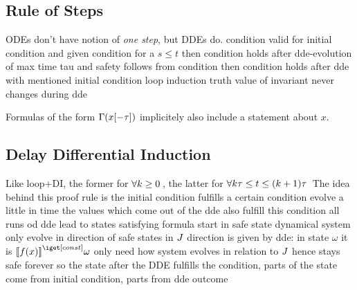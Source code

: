 \documentclass[10pt]{report}
\begin{document}
    \subsection{Rule of Steps}
        \label{sec:rule-of-steps}
        ODEs don't have notion of \emph{one step}, but DDEs do.
        condition valid for initial condition and given condition for a $s\leq t$ then condition holds after dde-evolution of max time tau and safety follows from condition then condition holds after dde with mentioned initial condition
        loop induction
        truth value of invariant never changes during dde

        \begin{calculus}
        \end{calculus}

        Formulas of the form $\Gamma(x[-\tau])$ implicitely also include a statement about $x$.

    \subsection{Delay Differential Induction}
        \label{sec:delay-differential-induction}

        Like loop+DI, the former for $\lforall{k\geq 0}$, the latter for $\lforall{k\tau\leq t \leq (k+1)\tau}$
        The idea behind this proof rule is
        the initial condition fulfills a certain condition
        evolve a little in time
        the values which come out of the dde also fulfill this condition
        all runs od dde lead to states satisfying formula
        start in safe state
        dynamical system only evolve in direction of safe states in $J$
        direction is given by dde: in state $\omega$ it is $\imodel{}{f(x)}\omega$
        only need how system evolves in relation to $J$
        hence stays safe forever
        so the state after the DDE fulfills the condition, parts of the state come from initial condition, parts from dde outcome
\end{document}
